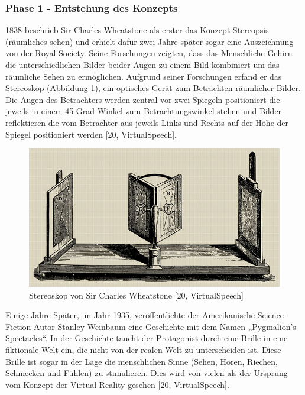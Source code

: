 \subsubsection{Phase 1 - Entstehung des Konzepts}
1838 beschrieb Sir Charles Wheatstone als erster das Konzept Stereopsis (räumliches sehen) und erhielt dafür zwei Jahre später sogar eine Auszeichnung von der Royal Society. Seine Forschungen zeigten, dass das Menschliche Gehirn die unterschiedlichen Bilder beider Augen zu einem Bild kombiniert um das räumliche Sehen zu ermöglichen. Aufgrund seiner Forschungen erfand er das Stereoskop (Abbildung \ref{fig:Stereoskop}), ein optisches Gerät zum Betrachten räumlicher Bilder. Die Augen des Betrachters werden zentral vor zwei Spiegeln positioniert die jeweils in einem 45 Grad Winkel zum Betrachtungswinkel stehen und Bilder reflektieren die vom Betrachter aus jeweils Links und Rechts auf der Höhe der Spiegel positioniert werden [20, VirtualSpeech].
\begin{figure}[h]
	\centering
	\includegraphics[width=0.5\linewidth]{Bilder/A13_Stereoskop}
	\caption{Stereoskop von Sir Charles Wheatstone [20, VirtualSpeech]}
	\label{fig:Stereoskop}
\end{figure}
\newline
\noindent
Einige Jahre Später, im Jahr 1935, veröffentlichte der Amerikanische Science-Fiction Autor Stanley Weinbaum eine Geschichte mit dem Namen „Pygmalion’s Spectacles“. In der Geschichte taucht der Protagonist durch eine Brille in eine fiktionale Welt ein, die nicht von der realen Welt zu unterscheiden ist. Diese Brille ist sogar in der Lage die menschlichen Sinne (Sehen, Hören, Riechen, Schmecken und Fühlen) zu stimulieren. Dies wird von vielen als der Ursprung vom Konzept der Virtual Reality gesehen [20, VirtualSpeech].

